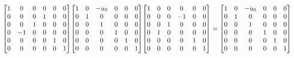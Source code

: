 \documentclass[11pt]{article}
\theoremstyle{definition}
\begin{document}
\[
\scaletoalign{\textwidth}{{\left[\begin{matrix}1 & 0 & 0 & 0 & 0 & 0\\0 & 0 & 0 & 1 & 0 & 0\\0 & 0 & 1 & 0 & 0 & 0\\0 & -1 & 0 & 0 & 0 & 0\\0 & 0 & 0 & 0 & 1 & 0\\0 & 0 & 0 & 0 & 0 & 1\end{matrix}\right]} {\left[\begin{matrix}1 & 0 & - u_{0} & 0 & 0 & 0\\0 & 1 & 0 & 0 & 0 & 0\\0 & 0 & 1 & 0 & 0 & 0\\0 & 0 & 0 & 1 & 0 & 0\\0 & 0 & 0 & 0 & 1 & 0\\0 & 0 & 0 & 0 & 0 & 1\end{matrix}\right]} {\left[\begin{matrix}1 & 0 & 0 & 0 & 0 & 0\\0 & 0 & 0 & -1 & 0 & 0\\0 & 0 & 1 & 0 & 0 & 0\\0 & 1 & 0 & 0 & 0 & 0\\0 & 0 & 0 & 0 & 1 & 0\\0 & 0 & 0 & 0 & 0 & 1\end{matrix}\right]} = {\left[\begin{matrix}1 & 0 & - u_{0} & 0 & 0 & 0\\0 & 1 & 0 & 0 & 0 & 0\\0 & 0 & 1 & 0 & 0 & 0\\0 & 0 & 0 & 1 & 0 & 0\\0 & 0 & 0 & 0 & 1 & 0\\0 & 0 & 0 & 0 & 0 & 1\end{matrix}\right]}}
\]
\end{document}
